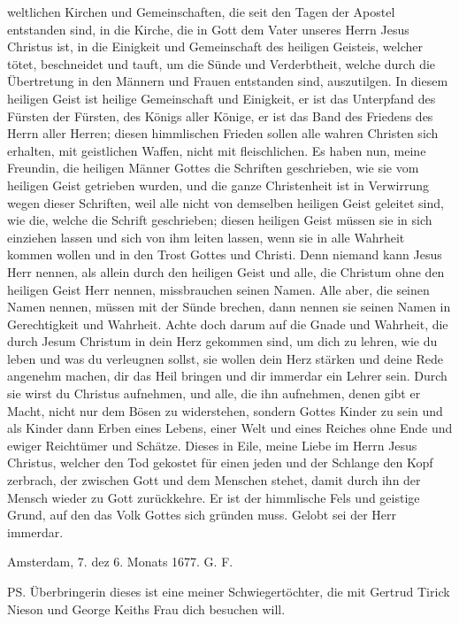 {  weltlichen Kirchen und Gemeinschaften, die seit den Tagen der
  Apostel entstanden sind, in die Kirche, die in Gott dem Vater
  unseres Herrn Jesus Christus ist, in die Einigkeit und Gemeinschaft
  des heiligen Geisteis, welcher tötet, 
  beschneidet und tauft, um die
  Sünde und Verderbtheit, welche durch die Übertretung in den
  Männern und Frauen entstanden sind, auszutilgen. In diesem
  heiligen Geist ist heilige Gemeinschaft und Einigkeit, er ist das
  Unterpfand des Fürsten der Fürsten, des Königs aller Könige,
  er ist das Band des Friedens des Herrn aller Herren; diesen
  himmlischen Frieden sollen alle wahren Christen sich erhalten, mit
  geistlichen Waffen, nicht mit fleischlichen.
  Es haben nun, meine Freundin, die heiligen Männer Gottes
  die Schriften geschrieben, wie sie vom heiligen Geist getrieben
  wurden, und die ganze Christenheit ist in Verwirrung wegen dieser
  Schriften, weil alle nicht von demselben heiligen Geist geleitet sind,
  wie die, welche die Schrift geschrieben; diesen heiligen Geist müssen
  sie in sich einziehen lassen und sich von ihm leiten lassen, wenn
  sie in alle Wahrheit kommen wollen und in den Trost Gottes
  und Christi. Denn niemand kann Jesus Herr nennen, als allein
  durch den heiligen Geist und alle, die Christum ohne den heiligen
  Geist Herr nennen, missbrauchen seinen Namen. Alle aber, die
  seinen Namen nennen, müssen mit der Sünde brechen, dann nennen
  sie seinen Namen in Gerechtigkeit und Wahrheit. Achte doch darum 
  auf die Gnade und Wahrheit, die durch Jesum Christum
  in dein Herz gekommen sind, um dich zu lehren, wie du leben
  und was du verleugnen sollst, sie wollen dein Herz stärken und
  deine Rede angenehm machen, dir das Heil bringen und dir
  immerdar ein Lehrer sein. Durch sie wirst du Christus aufnehmen,
  und alle, die ihn aufnehmen, denen gibt er Macht, nicht nur dem
  Bösen zu widerstehen, sondern Gottes Kinder zu sein und als
  Kinder dann Erben eines Lebens, einer Welt und eines Reiches
  ohne Ende und ewiger Reichtümer und Schätze. Dieses in Eile,
  meine Liebe im Herrn Jesus Christus, welcher den Tod gekostet
  für einen jeden und der Schlange den Kopf zerbrach, der zwischen
  Gott und dem Menschen stehet, damit durch ihn der Mensch wieder
  zu Gott zurückkehre. Er ist der himmlische Fels und geistige
  Grund, auf den das Volk Gottes sich gründen muss. Gelobt sei
  der Herr immerdar.

  \bigskip 

  \begin{flushright}Amsterdam, 7. dez 6. Monats 1677. G. F.\end{flushright}

  \bigskip 

  PS. Überbringerin dieses ist eine meiner Schwiegertöchter,
  die mit Gertrud Tirick Nieson 
  und George Keiths Frau dich 
  besuchen will.
}


